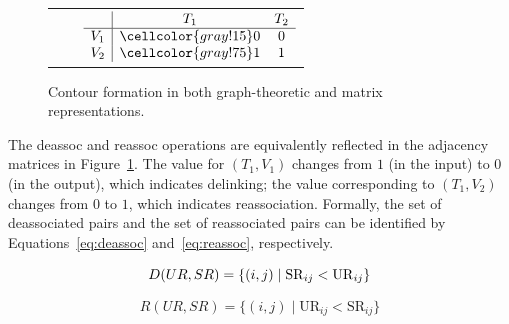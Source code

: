 \documentclass[pmlr]{jmlr}%
\begin{document}
\begin{figure}
\begin{minipage}[t]{0.48\textwidth}
\begin{tabular}{c c c}
				&&
				
				$
				\begin{array}{c|cc}
					& T_1 & T_2\\
					\hline
					V_1 & \cellcolor{gray!15}0 & 0 \\
					V_2 & \cellcolor{gray!75}1 & 1 \\
				\end{array}
				$
				
			\end{tabular}
			
		\end{minipage}
		\caption{Contour formation in both graph-theoretic and matrix representations.}
		\label{fig:hiatus}
	\end{figure}
	
	
	
	
	The \textsf{deassoc} and \textsf{reassoc} operations are
	equivalently reflected in the adjacency matrices in
	Figure~\ref{fig:hiatus}. The value for $(T_1,V_1)$ 
	changes from $1$ (in the input) to $0$ (in the output),
	which indicates delinking; the value corresponding
	to $(T_1,V_2)$  changes from $0$ to $1$,
	which indicates reassociation.
	Formally, the set of deassociated pairs
	and the set of reassociated pairs 
	can be identified by Equations~\ref{eq:deassoc}
	and~\ref{eq:reassoc}, respectively.
	
	\vspace{-1ex}
	\noindent\hfill
	\begin{minipage}{0.475\linewidth}
		\begin{equation}
			\label{eq:deassoc}
			D(UR,SR)=\{(i,j) \mid \mathrm{SR}_{ij}<\mathrm{UR}_{ij}\}\\
		\end{equation}
	\end{minipage}\hfill
	\begin{minipage}{0.475\linewidth}
		\begin{equation}
			\label{eq:reassoc}
			R(UR,SR)=\{(i,j) \mid \mathrm{UR}_{ij}< \mathrm{SR}_{ij}\}  
		\end{equation}
	\end{minipage}\hfill
	\vspace{-1ex}
	
\end{document}
